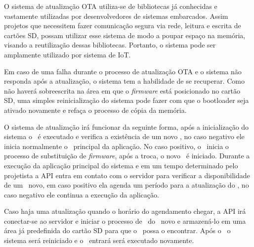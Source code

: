 O sistema de atualização OTA utiliza-se de bibliotecas já conhecidas e vastamente utilizadas por desenvolvedores de sistemas embarcados. Assim projetos que necessitem fazer comunicação segura via rede, leitura e escrita de cartões SD, possam utilizar esse sistema de modo a poupar espaço na memória, visando a reutilização dessas bibliotecas. Portanto, o sistema pode ser amplamente utilizado por sistema de IoT. 

Em caso de uma falha durante o processo de atualização OTA e o sistema não responda após a atualização, o sistema tem a habilidade de se recuperar. Como não haverá sobreescrita na área em que o \textit{firmware} está posicionado no cartão SD, uma simples reinicialização do sistema pode fazer com que o bootloader seja ativado novamente e refaça o processo de cópia da memória.

O sistema de atualização irá funcionar da seguinte forma, após a inicialização do sistema o \bootloader\ é executado e verifica a existência de um novo \firmware, no caso negativo ele inicia normalmente o \software\ principal da aplicação. No caso positivo, o \bootloader\ inicia o processo de substituição de \textit{firmware}, após a troca, o novo \software\ é iniciado. Durante a execução da aplicação principal do sistema e em um tempo determinado pelo projetista a API entra em contato com o servidor para verificar a disponibilidade de um \software\ novo, em caso positivo ela agenda um período para a atualização do \firmware, no caso negativo ele continua a execução da aplicação. 

Caso haja uma atualização quando o horário do agendamento chegar, a API irá conectar-se ao servidor e iniciar o processo de \download\ do \firmware\ novo e armazená-lo em uma área já predefinida do cartão SD para que o \bootloader\ possa o encontrar. Após o \download\ o sistema será reiniciado e o \bootloader\ entrará será executado novamente. 





